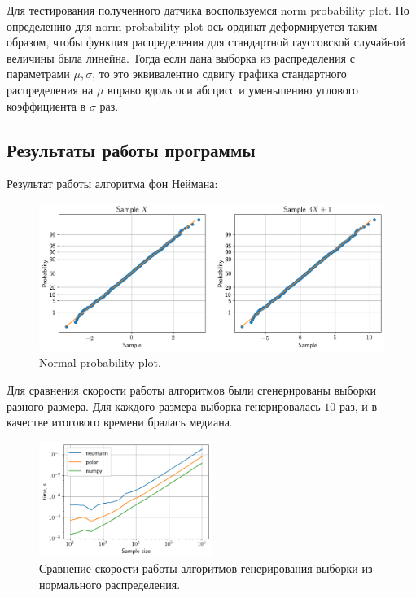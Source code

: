 \documentclass[12pt, a4paper]{article} %
\begin{document}
Для тестирования полученного датчика воспользуемся norm probability plot.
По определению для norm probability plot ось ординат деформируется таким образом,
чтобы функция распределения для стандартной гауссовской случайной величины была линейна.
Тогда если дана выборка из распределения с параметрами $\mu, \sigma$,
то это эквивалентно сдвигу графика стандартного распределения на $\mu$ вправо вдоль оси абсцисс и уменьшению углового коэффициента в $\sigma$ раз.
\subsection{Результаты работы программы}

Результат работы алгоритма фон Неймана: 
\begin{figure}[H]
    \centering
    \includegraphics[width=\textwidth]{figures/04_normplot.png}
    \caption{Normal probability plot.}
    \label{fig:04_normplot}
\end{figure}

Для сравнения скорости работы алгоритмов были сгенерированы выборки разного размера. 
Для каждого размера выборка генерировалась $10$ раз, 
и в качестве итогового времени бралась медиана.
 \begin{figure}[H]
    \centering
    \includegraphics[width=0.5\textwidth]{figures/04_times.png}
    \caption{Сравнение скорости работы алгоритмов генерирования выборки из нормального распределения.}
    \label{fig:04_times}
\end{figure}
\end{document}
